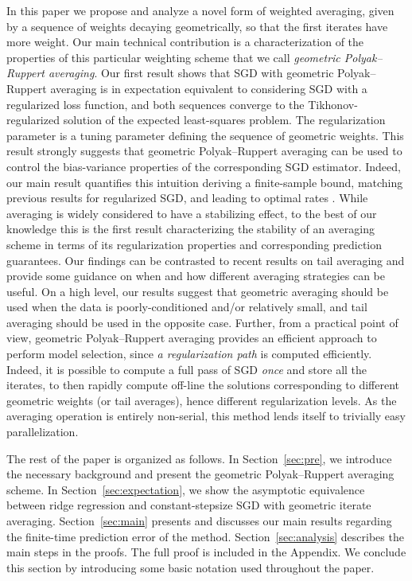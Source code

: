 \documentclass[final,12pt]{colt2018} %
\begin{document}
In this paper we propose and analyze a novel form of weighted averaging, given  by a sequence of weights  decaying geometrically, so that 
the first iterates have more weight. Our main technical contribution is a characterization of the properties of this particular 
weighting scheme that we call \emph{geometric Polyak--Ruppert averaging}. Our first 
result shows that SGD with geometric Polyak--Ruppert averaging is in expectation equivalent to considering SGD with a regularized loss 
function, and both sequences converge to the Tikhonov-regularized solution of the expected least-squares problem. The regularization 
parameter is a tuning parameter defining the sequence of geometric weights. This result strongly suggests that geometric Polyak--Ruppert 
averaging can be used to control the bias-variance properties of the corresponding SGD estimator. Indeed, our main result quantifies this 
intuition deriving a finite-sample bound,  matching previous results for regularized SGD, and   leading to   optimal rates \citep{T08}.
While averaging is widely considered to have a stabilizing effect,   to the best of 
our knowledge this is the first result  characterizing  the stability of an averaging scheme in terms of its regularization properties and 
corresponding prediction guarantees. Our findings can be contrasted to recent results on tail averaging \citep{JKKNS16} and provide some 
guidance on when and how different averaging strategies can be useful. On a high level, our results suggest that geometric averaging should 
be used when the data is poorly-conditioned and/or relatively small, and tail averaging should be used in the opposite case.
Further, from a practical point of view,  geometric Polyak--Ruppert averaging provides an efficient approach to perform model 
selection, since 
{\em a regularization path} \citep{HTF01} is computed efficiently.  Indeed, it is possible to compute a full pass of SGD  \emph{once} and 
store all the iterates, to then rapidly compute off-line the solutions corresponding to different geometric weights (or tail averages), 
hence different regularization levels. As the averaging operation is entirely non-serial, this method lends itself to trivially easy 
parallelization.


The rest of the paper is organized as follows. In Section~\ref{sec:pre}, we introduce the necessary background and present the geometric 
Polyak--Ruppert averaging scheme. In Section~\ref{sec:expectation}, we show the asymptotic equivalence between ridge regression and 
constant-stepsize SGD with geometric iterate averaging. Section~\ref{sec:main} presents and discusses our main results regarding 
the finite-time prediction error of the method.
Section~\ref{sec:analysis} describes the main steps in the proofs. The full proof is included in the Appendix. 
We conclude this section by  introducing some basic notation used throughout the paper.
\end{document}
